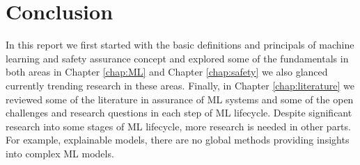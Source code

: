 \chapter{Conclusion}

In this report we first started with the basic definitions and principals of machine learning and safety assurance concept and explored some of the fundamentals in both areas in Chapter \ref{chap:ML} and Chapter \ref{chap:safety} we also glanced currently trending research in these areas. Finally, in Chapter \ref{chap:literature} we reviewed some of the literature in assurance of ML systems and some of the open challenges and research questions in each step of ML lifecycle. Despite significant research into some stages of ML lifecycle, more research is needed in other parts. For example, explainable models, there are no global methods providing insights into complex ML models.  %